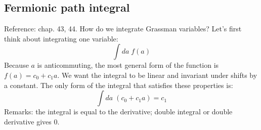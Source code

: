 \documentclass[12 pt]{article}
\begin{document}
\subsection*{Fermionic path integral}
Reference: chap. 43, 44. How do we integrate Grassman variables? Let's first think about integrating one variable:
\[       \int da \; f(a)     \]
Because $a$ is anticommuting, the most general form of the function is $f(a) = c_0 + c_1 a$. We want the integral to be linear and invariant under shifts by a constant. The only form of the integral that satisfies these properties is:
\[        \int da \;  (c_0 + c_1 a) = c_1    \]
Remarks: the integral is equal to the derivative; double integral or double derivative gives 0.
\end{document}
